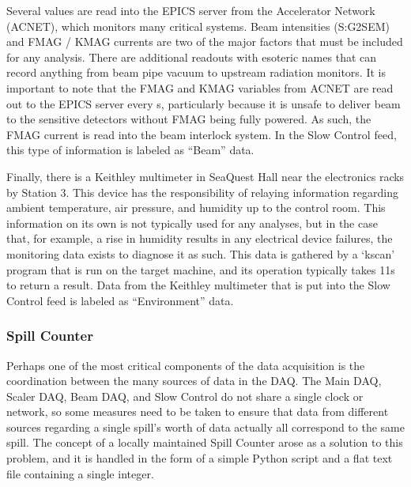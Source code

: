 Several values are read into the EPICS server from the Accelerator Network (ACNET), which monitors many critical systems. Beam intensities (S:G2SEM) and FMAG / KMAG currents are two of the major factors that must be included for any analysis. There are additional readouts with esoteric names that can record anything from beam pipe vacuum to upstream radiation monitors. It is important to note that the FMAG and KMAG variables from ACNET are read out to the EPICS server every \unit[3]{s}, particularly because it is unsafe to deliver beam to the sensitive detectors without FMAG being fully powered. As such, the FMAG current is read into the beam interlock system. In the Slow Control feed, this type of information is labeled as ``Beam'' data.

Finally, there is a Keithley multimeter in SeaQuest Hall near the electronics racks by Station 3. This device has the responsibility of relaying information regarding ambient temperature, air pressure, and humidity up to the control room. This information on its own is not typically used for any analyses, but in the case that, for example, a rise in humidity results in any electrical device failures, the monitoring data exists to diagnose it as such. This data is gathered by a `kscan' program that is run on the target machine, and its operation typically takes 11s to return a result. Data from the Keithley multimeter that is put into the Slow Control feed is labeled as ``Environment'' data.

\subsubsection{Spill Counter}

Perhaps one of the most critical components of the data acquisition is the coordination between the many sources of data in the DAQ. The Main DAQ, Scaler DAQ, Beam DAQ, and Slow Control do not share a single clock or network, so some measures need to be taken to ensure that data from different sources regarding a single spill's worth of data actually all correspond to the same spill. The concept of a locally maintained Spill Counter arose as a solution to this problem, and it is handled in the form of a simple Python script and a flat text file containing a single integer.

